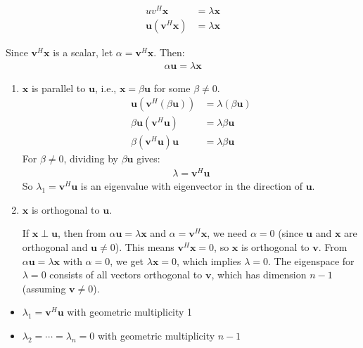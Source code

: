 \begin{align*}
    uv^H \mathbf{x}                     & = \lambda \mathbf{x} \\
    \mathbf{u}(\mathbf{v}^H \mathbf{x}) & = \lambda \mathbf{x}
\end{align*}

Since $\mathbf{v}^H \mathbf{x}$ is a scalar, let $\alpha = \mathbf{v}^H \mathbf{x}$. Then:
\begin{align*}
    \alpha \mathbf{u} = \lambda \mathbf{x}
\end{align*}
\begin{enumerate}
    \item $\mathbf{x}$ is parallel to $\mathbf{u}$, i.e., $\mathbf{x} = \beta \mathbf{u}$ for some $\beta \neq 0$.
          \begin{align*}
              \mathbf{u}(\mathbf{v}^H (\beta \mathbf{u})) & = \lambda (\beta \mathbf{u}) \\
              \beta \mathbf{u}(\mathbf{v}^H \mathbf{u})   & = \lambda \beta \mathbf{u}   \\
              \beta (\mathbf{v}^H \mathbf{u}) \mathbf{u}  & = \lambda \beta \mathbf{u}
          \end{align*}
          For $\beta \neq 0$, dividing by $\beta \mathbf{u}$ gives:
          \begin{align*}
              \lambda = \mathbf{v}^H \mathbf{u}
          \end{align*}
          So $\lambda_1 = \mathbf{v}^H \mathbf{u}$ is an eigenvalue with eigenvector in the direction of $\mathbf{u}$.
    \item $\mathbf{x}$ is orthogonal to $\mathbf{u}$.

          If $\mathbf{x} \perp \mathbf{u}$, then from $\alpha \mathbf{u} = \lambda \mathbf{x}$ and $\alpha = \mathbf{v}^H \mathbf{x}$, we need $\alpha = 0$ (since $\mathbf{u}$ and $\mathbf{x}$ are orthogonal and $\mathbf{u} \neq 0$).
          This means $\mathbf{v}^H \mathbf{x} = 0$, so $\mathbf{x}$ is orthogonal to $\mathbf{v}$. From $\alpha \mathbf{u} = \lambda \mathbf{x}$ with $\alpha = 0$, we get $\lambda \mathbf{x} = 0$, which implies $\lambda = 0$.
          The eigenspace for $\lambda = 0$ consists of all vectors orthogonal to $\mathbf{v}$, which has dimension $n-1$ (assuming $\mathbf{v} \neq 0$).
\end{enumerate}

\begin{itemize}
    \item  $\lambda_1 = \mathbf{v}^H \mathbf{u}$ with geometric multiplicity 1
    \item  $\lambda_2 = \cdots = \lambda_n = 0$ with geometric multiplicity $n-1$
\end{itemize}

